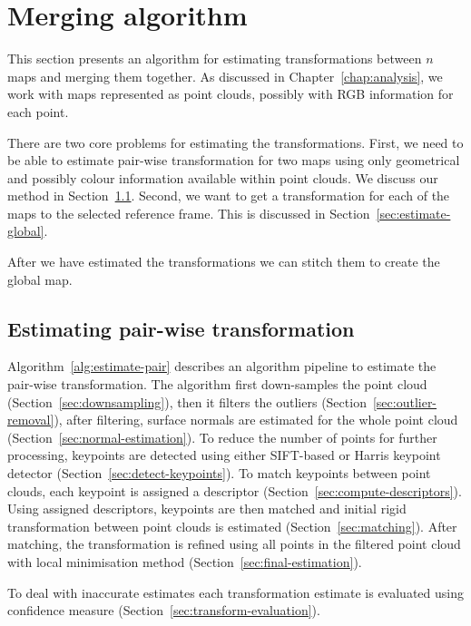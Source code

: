\chapter{Merging algorithm}
\label{chap:mergingalgorithm}


This section presents an algorithm for estimating transformations between $n$ maps and merging them together. As discussed in Chapter~\ref{chap:analysis}, we work with maps represented as point clouds, possibly with \gls{RGB} information for each point.

There are two core problems for estimating the transformations. First, we need to be able to estimate pair-wise transformation for two maps using only geometrical and possibly colour information available within point clouds. We discuss our method in Section~\ref{sec:estimate-pair-wise}. Second, we want to get a transformation for each of the maps to the selected reference frame. This is discussed in Section~\ref{sec:estimate-global}.

After we have estimated the transformations we can stitch them to create the global map.

\section{Estimating pair-wise transformation}
\label{sec:estimate-pair-wise}

Algorithm~\ref{alg:estimate-pair} describes an algorithm pipeline to estimate the pair-wise transformation. The algorithm first down-samples the point cloud (Section~\ref{sec:downsampling}), then it filters the outliers (Section~\ref{sec:outlier-removal}), after filtering, surface normals are estimated for the whole point cloud (Section~\ref{sec:normal-estimation}). To reduce the number of points for further processing, keypoints are detected using either \gls{SIFT}-based or Harris keypoint detector (Section~\ref{sec:detect-keypoints}). To match keypoints between point clouds, each keypoint is assigned a descriptor (Section~\ref{sec:compute-descriptors}). Using assigned descriptors, keypoints are then matched and initial rigid transformation between point clouds is estimated (Section~\ref{sec:matching}). After matching, the transformation is refined using all points in the filtered point cloud with local minimisation method (Section~\ref{sec:final-estimation}).

To deal with inaccurate estimates each transformation estimate is evaluated using confidence measure (Section~\ref{sec:transform-evaluation}).

